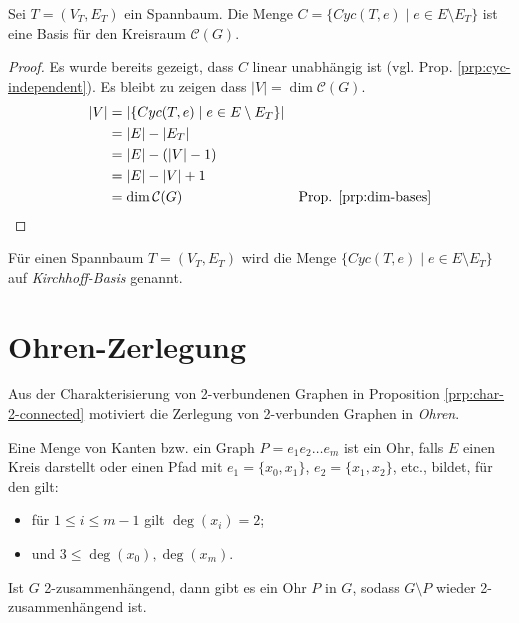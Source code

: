 \begin{proposition}
    Sei $ T = (V_T, E_T) $ ein Spannbaum.
    Die Menge $ C = \{ Cyc(T, e) \mid e \in E \setminus E_T \} $ ist eine Basis für den Kreisraum $ \mathcal{C}(G) $.
\end{proposition}

\begin{proof}
    Es wurde bereits gezeigt, dass $ C $ linear unabhängig ist (vgl. Prop. \ref{prp:cyc-independent}).
    Es bleibt zu zeigen dass $ |V| = \dim \mathcal{C}(G) $.
    \begin{align*}
        |V| &= |\{ Cyc(T, e) \mid e \in E \setminus E_T \}| \\
            &= |E| - |E_T| \\
            &= |E| - (|V| - 1) \\
            &= |E| - |V| + 1 \\
            &= \dim \mathcal{C}(G) & \text{Prop. \ref{prp:dim-bases}}
    \end{align*}
\end{proof}

\begin{remark}
    Für einen Spannbaum $ T = (V_T, E_T) $ wird die Menge $ \{ Cyc(T, e) \mid e \in E \setminus E_T \} $ auf \textit{Kirchhoff-Basis} genannt.
\end{remark}

\section{Ohren-Zerlegung}

Aus der Charakterisierung von 2-verbundenen Graphen in Proposition \ref{prp:char-2-connected} motiviert die Zerlegung von 2-verbunden Graphen in \textit{Ohren}.

\begin{definition}[Ohr]
    Eine Menge von Kanten bzw. ein Graph $ P = e_1e_2\dots e_m $ ist ein Ohr, falls $ E $ einen Kreis darstellt oder einen Pfad mit $ e_1 = \{ x_0, x_1 \} $, $ e_2 = \{ x_1, x_2 \} $, etc., bildet, für den gilt:
    \begin{itemize}
        \item für $ 1 \leq i \leq m - 1 $ gilt $ \deg(x_i) = 2 $;
        \item und $ 3 \leq \deg(x_0), \deg(x_m) $.
    \end{itemize}
\end{definition}

\begin{theorem}
    Ist $ G $ 2-zusammenhängend, dann gibt es ein Ohr $ P $ in $ G $, sodass $ G \setminus P $ wieder 2-zusammenhängend ist.
\end{theorem}

